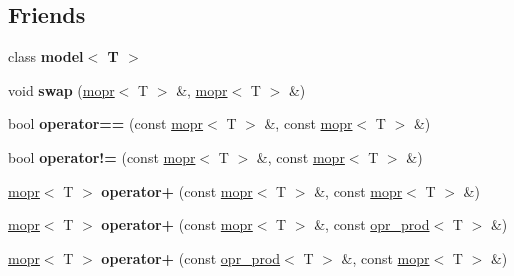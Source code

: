 \subsection*{Friends}
\begin{DoxyCompactItemize}
\item 
\mbox{\label{classqbasis_1_1mopr_a4ddaa0e3eeb5f16ab585095f2dba8da1}} 
class {\bfseries model$<$ T $>$}
\item 
\mbox{\label{classqbasis_1_1mopr_ab68e757926117585eb5075906b14148a}} 
void {\bfseries swap} (\hyperlink{classqbasis_1_1mopr}{mopr}$<$ T $>$ \&, \hyperlink{classqbasis_1_1mopr}{mopr}$<$ T $>$ \&)
\item 
\mbox{\label{classqbasis_1_1mopr_a5ccdab0bf85735458760ef48aef96a9c}} 
bool {\bfseries operator==} (const \hyperlink{classqbasis_1_1mopr}{mopr}$<$ T $>$ \&, const \hyperlink{classqbasis_1_1mopr}{mopr}$<$ T $>$ \&)
\item 
\mbox{\label{classqbasis_1_1mopr_a9d5a693b5023a753c2af0dacf92b8915}} 
bool {\bfseries operator!=} (const \hyperlink{classqbasis_1_1mopr}{mopr}$<$ T $>$ \&, const \hyperlink{classqbasis_1_1mopr}{mopr}$<$ T $>$ \&)
\item 
\mbox{\label{classqbasis_1_1mopr_ade29674937fe23e2ff3877f551fc0acf}} 
\hyperlink{classqbasis_1_1mopr}{mopr}$<$ T $>$ {\bfseries operator+} (const \hyperlink{classqbasis_1_1mopr}{mopr}$<$ T $>$ \&, const \hyperlink{classqbasis_1_1mopr}{mopr}$<$ T $>$ \&)
\item 
\mbox{\label{classqbasis_1_1mopr_a5dc6b67acab6eb7fc1048c7d8a416069}} 
\hyperlink{classqbasis_1_1mopr}{mopr}$<$ T $>$ {\bfseries operator+} (const \hyperlink{classqbasis_1_1mopr}{mopr}$<$ T $>$ \&, const \hyperlink{classqbasis_1_1opr__prod}{opr\+\_\+prod}$<$ T $>$ \&)
\item 
\mbox{\label{classqbasis_1_1mopr_ae9efa24ba50d1fed81857303a64761fb}} 
\hyperlink{classqbasis_1_1mopr}{mopr}$<$ T $>$ {\bfseries operator+} (const \hyperlink{classqbasis_1_1opr__prod}{opr\+\_\+prod}$<$ T $>$ \&, const \hyperlink{classqbasis_1_1mopr}{mopr}$<$ T $>$ \&)
\item 

\end{DoxyCompactItemize}
